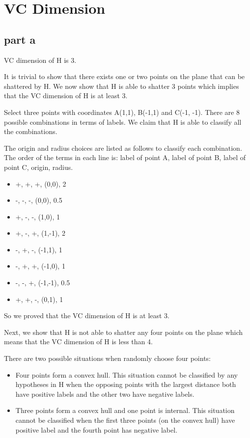 \section{VC Dimension}

\subsection{part a}
VC dimension of H is 3.

It is trivial to show that there exists one or two points on the plane that can be shattered by H. We now show that H is able to shatter 3 points which implies that the VC dimension of H is at least 3.

Select three points with coordinates A(1,1), B(-1,1) and C(-1, -1). There are 8 possible combinations in terms of labels. We claim that H is able to classify all the combinations.

The origin and radius choices are listed as follows to classify each combination. The order of the terms in each line is: label of point A, label of point B, label of point C, origin, radius.
\begin{itemize}
\item +, +, +, (0,0), 2
\item -, -, -, (0,0), 0.5
\item +, -, -, (1,0), 1
\item +, -, +, (1,-1), 2
\item -, +, -, (-1,1), 1
\item -, +, +, (-1,0), 1
\item -, -, +, (-1,-1), 0.5
\item +, +, -, (0,1), 1
\end{itemize}

So we proved that the VC dimension of H is at least 3.

Next, we show that H is not able to shatter any four points on the plane which means that the VC dimension of H is less than 4.

There are two possible situations when randomly choose four points:
\begin{itemize}
\item Four points form a convex hull. This situation cannot be classified by any hypotheses in H when the opposing points with the largest distance both have positive labels and the other two have negative labels.
\item Three points form a convex hull and one point is internal. This situation cannot be classified when the first three points (on the convex hull) have positive label and the fourth point has negative label.
\end{itemize}

